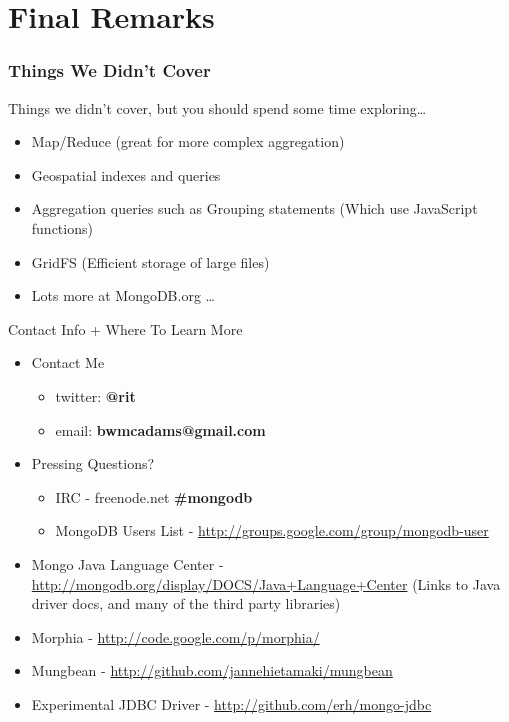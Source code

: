 \documentclass{beamer}
\begin{document}
\section{Final Remarks}
\begin{frame}
\frametitle{Things We Didn't Cover}
    Things we didn't cover, but you should spend some time exploring\ldots
    \begin{itemize}
        \item Map/Reduce (great for more complex aggregation)
        \item Geospatial indexes and queries
        \item Aggregation queries such as Grouping statements (Which use JavaScript functions)
        \item GridFS (Efficient storage of large files)
        \item Lots more at MongoDB.org \ldots
    \end{itemize}
\end{frame}
\begin{frame}{Contact Info + Where To Learn More}
    \begin{itemize}
        \item Contact Me
        \begin{itemize}
            \item twitter: {\bf @rit}
            \item email: {\bf bwmcadams@gmail.com}
        \end{itemize}
        \item Pressing Questions?
        \begin{itemize}
            \item IRC - {freenode.net \bf\#mongodb}
            \item MongoDB Users List - \url{http://groups.google.com/group/mongodb-user}
        \end{itemize}
    \item Mongo Java Language Center - \url{http://mongodb.org/display/DOCS/Java+Language+Center} {(\tiny Links to Java driver docs, and many of the third party libraries)}
        \item Morphia - \url{http://code.google.com/p/morphia/}
        \item Mungbean - \url{http://github.com/jannehietamaki/mungbean}
        \item Experimental JDBC Driver - \url{http://github.com/erh/mongo-jdbc}
    \end{itemize}
\end{frame}
\end{document}

